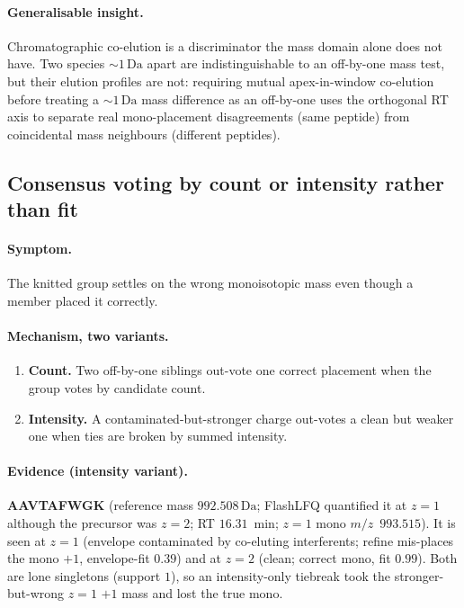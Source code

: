 \documentclass[11pt]{article}
\newcommand{\Da}{\,\text{Da}}
\newcommand{\mz}{\ensuremath{m/z}}
\newcommand{\zeq}[1]{\ensuremath{z{=}#1}}
\begin{document}
\paragraph{Generalisable insight.} Chromatographic co-elution is a discriminator the mass domain
alone does not have. Two species $\sim 1\Da$ apart are indistinguishable to an off-by-one mass test,
but their elution profiles are not: requiring mutual apex-in-window co-elution before treating a
$\sim 1\Da$ mass difference as an off-by-one uses the orthogonal RT axis to separate real
mono-placement disagreements (same peptide) from coincidental mass neighbours (different peptides).

\subsection{Consensus voting by count or intensity rather than fit}
\label{sec:vote}

\paragraph{Symptom.} The knitted group settles on the wrong monoisotopic mass even though a member
placed it correctly.

\paragraph{Mechanism, two variants.}
\begin{enumerate}[label=(\alph*),leftmargin=1.8em]
  \item \textbf{Count.} Two off-by-one siblings out-vote one correct placement when the group votes
  by candidate count.
  \item \textbf{Intensity.} A contaminated-but-stronger charge out-votes a clean but weaker one when
  ties are broken by summed intensity.
\end{enumerate}

\paragraph{Evidence (intensity variant).} \textbf{AAVTAFWGK} (reference mass $992.508\Da$;
FlashLFQ quantified it at \zeq{1} although the precursor was \zeq{2}; RT $16.31$~min; \zeq{1} mono
\mz\ $993.515$). It is seen at \zeq{1} (envelope contaminated by co-eluting interferents; refine
mis-places the mono $+1$, envelope-fit $0.39$) and at \zeq{2} (clean; correct mono, fit $0.99$).
Both are lone singletons (support $1$), so an intensity-only tiebreak took the stronger-but-wrong
\zeq{1} $+1$ mass and lost the true mono.
\end{document}
